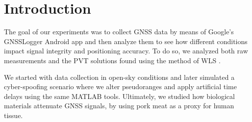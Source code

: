 \section{Introduction}
\label{sec:intro}

The goal of our experiments was to collect GNSS data by means of Google’s GNSSLogger Android app and then analyze them to see how different conditions impact signal integrity and positioning accuracy. 
To do so, we analyzed both raw measurements and the PVT solutions found using the method of WLS \cite{wikipediaWLS}. 

We started with data collection in open-sky conditions and later simulated a cyber-spoofing scenario where we alter pseudoranges and apply artificial time delays using the same MATLAB tools. Ultimately, we studied how biological materials attenuate GNSS signals, by using pork meat as a proxy for human tissue.